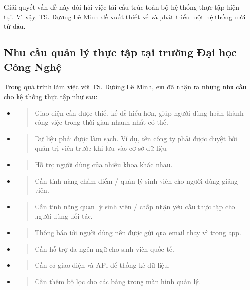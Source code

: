 \documentclass[./../main.tex]{subfiles}
\begin{document}
Giải quyết vấn đề này đòi hỏi việc tái cấu trúc toàn bộ hệ thống thực
tập hiện tại. Vì vậy, TS. Dương Lê Minh đề xuất thiết kế và phát triển
một hệ thống mới từ đầu.

\subsection{Nhu cầu quản lý thực tập tại trường Đại học Công Nghệ}

Trong quá trình làm việc với TS. Dương Lê Minh, em đã nhận ra những nhu
cầu cho hệ thống thực tập như sau:

\begin{itemize}
\item
  \begin{quote}
  Giao diện cần được thiết kế dễ hiểu hơn, giúp người dùng hoàn thành
  công việc trong thời gian nhanh nhất có thể.
  \end{quote}
\item
  \begin{quote}
  Dữ liệu phải được làm sạch. Ví dụ, tên công ty phải được duyệt bởi
  quản trị viên trước khi lưu vào cơ sở dữ liệu
  \end{quote}
\item
  \begin{quote}
  Hỗ trợ người dùng của nhiều khoa khác nhau.
  \end{quote}
\item
  \begin{quote}
  Cần tính năng chấm điểm / quản lý sinh viên cho người dùng giảng viên.
  \end{quote}
\item
  \begin{quote}
  Cần tính năng quản lý sinh viên / chấp nhận yêu cầu thực tập cho người
  dùng đối tác.
  \end{quote}
\item
  \begin{quote}
  Thông báo tới người dùng nên được gửi qua email thay vì trong app.
  \end{quote}
\item
  \begin{quote}
  Cần hỗ trợ đa ngôn ngữ cho sinh viên quốc tế.
  \end{quote}
\item
  \begin{quote}
  Cần có giao diện và API để thống kê dữ liệu.
  \end{quote}
\item
  \begin{quote}
  Cần thêm bộ lọc cho các bảng trong màn hình quản lý.
  \end{quote}
\end{itemize}
\end{document}
